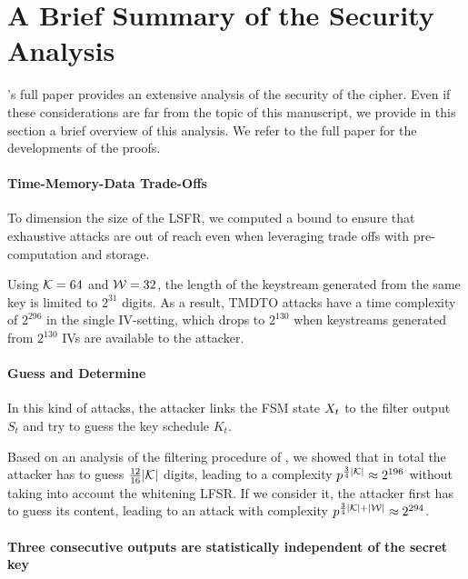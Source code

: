 
\section{A Brief Summary of the Security Analysis}
\label{sec:security}

\coolName's full paper provides an extensive analysis of the security of the cipher. Even if these considerations are far from the topic of this manuscript, we provide in this section a brief overview of this analysis. We refer to the full paper \cite{transistor} for the developments of the proofs.


\paragraph{Time-Memory-Data Trade-Offs}

To dimension the size of the LSFR, we computed a bound to ensure that exhaustive attacks are out of reach even when leveraging trade offs with pre-computation and storage. 

Using $\mathcal{K} = 64$ and $\mathcal{W} = 32$, the length of the keystream generated from the same key is limited to $2^{31}$ digits. As a result, TMDTO attacks have a time complexity of $2^{296}$ in the single IV-setting, which drops to $2^{130}$ when keystreams generated from $2^{130}$ IVs are available to the attacker.

\paragraph{Guess and Determine}

In this kind of attacks, the attacker links the FSM state $X_{t}$ to the filter output $S_t$ and try to guess the key schedule $K_t$.

Based on an analysis of the filtering procedure of \coolName, we showed that in total the attacker has to guess $\frac{12}{16}|\mathcal{K}|$ digits, leading to a complexity \( p^{\frac{3}{4} | \mathcal{K} |} \approx 2^{196}\) without taking into account the whitening LFSR. If we consider it, the attacker first has to
guess its content, leading to an attack with complexity
\( p^{\frac{3}{4} | \mathcal{K} | + | \mathcal{W} |} \approx 2^{294}\).
%


\paragraph{Three consecutive outputs are statistically independent of the secret key}

